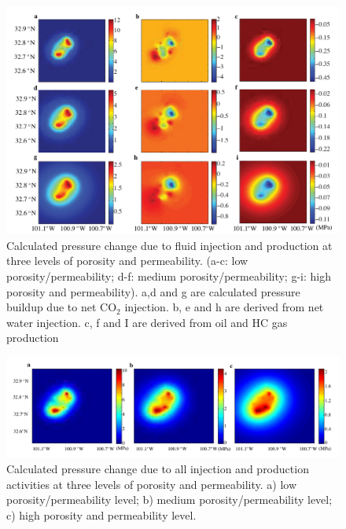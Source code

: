 \clearpage
\begin{figure}
	\centering
	\includegraphics[width=\textwidth]{figs_paper3/Fig7.pdf}	
	\caption{Calculated pressure change due to fluid injection and production at three levels of porosity and permeability. (a-c: low porosity/permeability; d-f: medium porosity/permeability; g-i: high porosity and permeability).  a,d and g are calculated pressure buildup due to net CO$_{2}$ injection.  b, e and h are derived from net water injection.  c, f and I are derived from oil and HC gas production}
	\label{fig:ind_pred_pressure}
\end{figure}

\clearpage
\begin{figure}
	\centering
	\includegraphics[width=\textwidth]{figs_paper3/Fig8.pdf}	
	\caption{Calculated pressure change due to all injection and production activities at three levels of porosity and permeability. a) low porosity/permeability level; b) medium porosity/permeability level; c) high porosity and permeability level.}
	\label{fig:tot_pred_pressure}
\end{figure}

